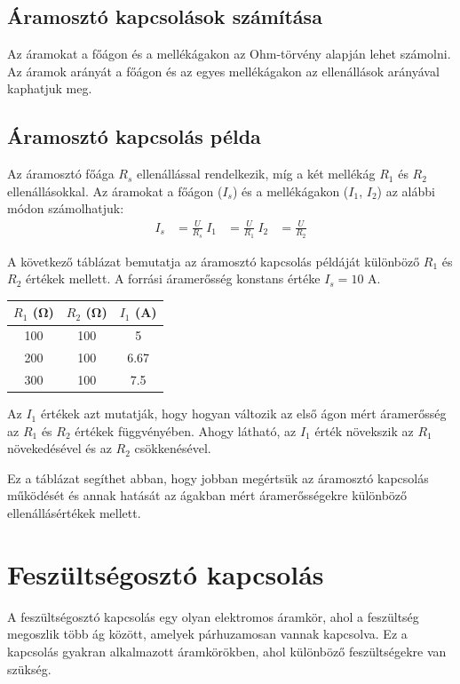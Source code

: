 \documentclass{article}
\begin{document}
{\subsection{Áramosztó kapcsolások számítása}
Az áramokat a főágon és a mellékágakon az Ohm-törvény alapján lehet számolni. Az áramok arányát a főágon és az egyes mellékágakon az ellenállások arányával kaphatjuk meg.

\subsection{Áramosztó kapcsolás példa}
Az áramosztó főága $R_s$ ellenállással rendelkezik, míg a két mellékág $R_1$ és $R_2$ ellenállásokkal. Az áramokat a főágon ($I_s$) és a mellékágakon ($I_1$, $I_2$) az alábbi módon számolhatjuk:
\begin{align*}
I_s &= \frac{U}{R_s} \
I_1 &= \frac{U}{R_1} \
I_2 &= \frac{U}{R_2}
\end{align*}

A következő táblázat bemutatja az áramosztó kapcsolás példáját különböző $R_1$ és $R_2$ értékek mellett. A forrási áramerősség konstans értéke $I_s = 10$ A.

\begin{center}
\begin{tabular}{|c|c|c|}
\hline
\textbf{$R_1$ (\si{\ohm})} & \textbf{$R_2$ (\si{\ohm})} & \textbf{$I_1$ (\si{\ampere})} \\
\hline
100 & 100 & 5 \\
200 & 100 & 6.67 \\
300 & 100 & 7.5 \\
\hline
\end{tabular}
\end{center}

Az $I_1$ értékek azt mutatják, hogy hogyan változik az első ágon mért áramerősség az $R_1$ és $R_2$ értékek függvényében. Ahogy látható, az $I_1$ érték növekszik az $R_1$ növekedésével és az $R_2$ csökkenésével.

Ez a táblázat segíthet abban, hogy jobban megértsük az áramosztó kapcsolás működését és annak hatását az ágakban mért áramerősségekre különböző ellenállásértékek mellett.

\section{Feszültségosztó kapcsolás}
A feszültségosztó kapcsolás egy olyan elektromos áramkör, ahol a feszültség megoszlik több ág között, amelyek párhuzamosan vannak kapcsolva. Ez a kapcsolás gyakran alkalmazott áramkörökben, ahol különböző feszültségekre van szükség.

}
\end{document}
